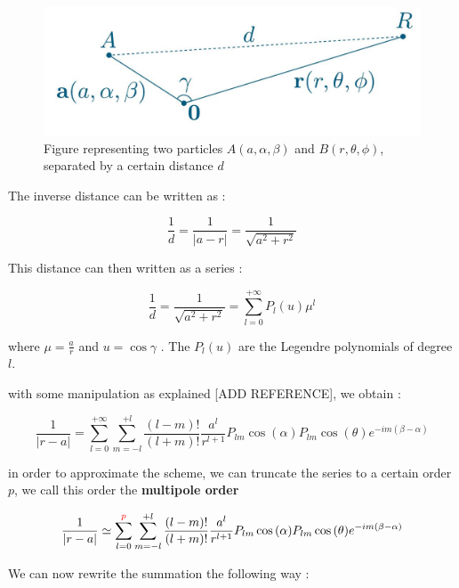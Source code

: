 \documentclass[11pt,twoside,a4paper]{report}
\begin{document}
	
\begin{figure}[H]
\includegraphics[scale=0.4]{distance}
 \centering 
\caption{Figure representing two particles $A(a,\alpha,\beta)$ and $B(r,\theta,\phi)$, separated by a certain distance $d$}
\label{fig:poster}
\end{figure}	
	
	
	The inverse distance can be written as :
	
	\begin{equation*}
		\frac{1}{d} = \frac{1}{|a-r|} = \frac{1}{\sqrt{a^2 + r^2}}
	\end{equation*}

	This distance can then written as a series :
	
	\begin{equation}
		\frac{1}{d} = \frac{1}{\sqrt{a^2 + r^2}} = \sum\limits_{l=0}^{+\infty} P_l(u)\mu^l
	\end{equation}
	
	
	where $\mu = \frac{a}{r}$ and $u = \cos{\gamma}$ . The $P_l(u)$ are the Legendre polynomials of degree $l$.
	
	with some manipulation as explained [ADD REFERENCE], we obtain : 
	
	\begin{equation}
	\frac{1}{|r - a|} = \sum\limits_{l=0}^{+\infty} \sum\limits_{m = -l}^{+l} \frac{(l-m)!}{(l+m)!} \frac{a^l}{r^{l+1}} P_{lm}\cos{(\alpha)}P_{lm}\cos{(\theta)}e^{-im(\beta - \alpha)}
	\end{equation}
	
	in order to approximate the scheme, we can truncate the series to a certain order $p$, we call this order the \textbf{multipole order}
	
	\begin{equation}
	\frac{1}{|r - a|} \simeq \sum\limits_{l=0}^{\textcolor{red}{p}} \sum\limits_{m = -l}^{+l} \frac{(l-m)!}{(l+m)!} \frac{a^l}{r^{l+1}} P_{lm}\cos{(\alpha)}P_{lm}\cos{(\theta)}e^{-im(\beta - \alpha)}
	\end{equation}
	
	We can now rewrite the summation the following way :
	
\end{document}
